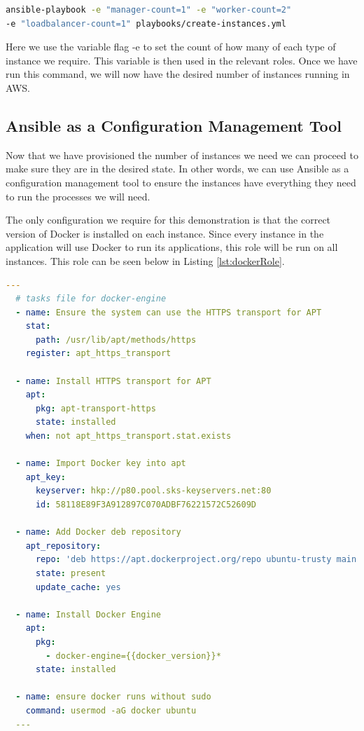 \documentclass{article}
\begin{document}
\begin{lstlisting}[language=bash]
ansible-playbook -e "manager-count=1" -e "worker-count=2" 
-e "loadbalancer-count=1" playbooks/create-instances.yml
\end{lstlisting}

Here we use the variable flag -e to set the count of how many of each type of instance we require. This variable is then used in the relevant roles. Once we have run this command, we will now have the desired number of instances running in AWS.

\subsection{Ansible as a Configuration Management Tool}
\label{subs:config_management}
Now that we have provisioned the number of instances we need we can proceed to make sure they are in the desired state. In other words, we can use Ansible as a configuration management tool to ensure the instances have everything they need to run the processes we will need. 

The only configuration we require for this demonstration is that the correct version of Docker is installed on each instance. Since every instance in the application will use Docker to run its applications, this role will be run on all instances. This role can be seen below in Listing \ref{lst:dockerRole}.

\begin{lstlisting}[float,floatplacement=H,language=yaml,caption={install-docker-engine.yml},label={lst:dockerRole},basicstyle=\small]
  ---
  # tasks file for docker-engine
  - name: Ensure the system can use the HTTPS transport for APT
    stat:
      path: /usr/lib/apt/methods/https
    register: apt_https_transport

  - name: Install HTTPS transport for APT
    apt:
      pkg: apt-transport-https
      state: installed
    when: not apt_https_transport.stat.exists

  - name: Import Docker key into apt
    apt_key:
      keyserver: hkp://p80.pool.sks-keyservers.net:80
      id: 58118E89F3A912897C070ADBF76221572C52609D

  - name: Add Docker deb repository
    apt_repository:
      repo: 'deb https://apt.dockerproject.org/repo ubuntu-trusty main'
      state: present
      update_cache: yes
      
  - name: Install Docker Engine
    apt:
      pkg:
        - docker-engine={{docker_version}}*
      state: installed

  - name: ensure docker runs without sudo
    command: usermod -aG docker ubuntu
  ---
\end{lstlisting}
\end{document}
